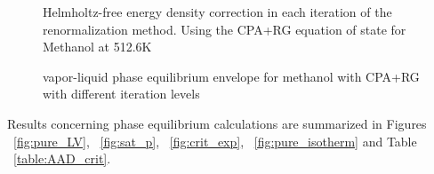 \documentclass[preprint,12pt,3p]{elsarticle}
\begin{document}
\begin{figure}[h!]
\centering
\captionsetup{justification=centering}
\caption{Helmholtz-free energy density correction in each iteration of the renormalization method. Using the CPA+RG equation of state for Methanol at 512.6K}
\label{fig:dfn}
\end{figure}
	
\begin{figure}[h!]
\centering
\captionsetup{justification=centering}
\caption{vapor-liquid phase equilibrium envelope for methanol with CPA+RG with different iteration levels}
\label{fig:PV_evol}
\end{figure}

    Results concerning phase equilibrium calculations are summarized in Figures ~\ref{fig:pure_LV}, ~\ref{fig:sat_p}, ~\ref{fig:crit_exp}, ~\ref{fig:pure_isotherm} and Table ~\ref{table:AAD_crit}.
\end{document}
